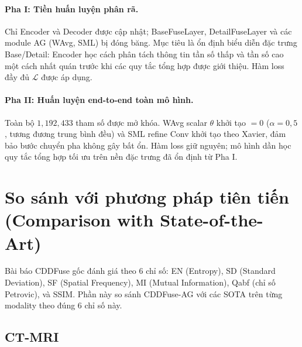 \paragraph{Pha I: Tiền huấn luyện phân rã.}
Chỉ Encoder và Decoder được cập nhật; BaseFuseLayer, DetailFuseLayer và các module AG (WAvg, SML) bị đóng băng. Mục tiêu là ổn định biểu diễn đặc trưng Base/Detail: Encoder học cách phân tách thông tin tần số thấp và tần số cao một cách nhất quán trước khi các quy tắc tổng hợp được giới thiệu. Hàm loss đầy đủ $\mathcal{L}$ được áp dụng.

\paragraph{Pha II: Huấn luyện end-to-end toàn mô hình.}
Toàn bộ $1{,}192{,}433$ tham số được mở khóa. WAvg scalar $\theta$ khởi tạo $= 0$ ($\alpha = 0{,}5$, tương đương trung bình đều) và SML refine Conv khởi tạo theo Xavier, đảm bảo bước chuyển pha không gây bất ổn. Hàm loss giữ nguyên; mô hình dần học quy tắc tổng hợp tối ưu trên nền đặc trưng đã ổn định từ Pha I.

\section{So sánh với phương pháp tiên tiến (Comparison with State-of-the-Art)}
\label{sec:paper-6metrics}

Bài báo CDDFuse gốc \cite{zhao2023cddfuse} đánh giá theo 6 chỉ số: EN (Entropy), SD (Standard Deviation), SF (Spatial Frequency), MI (Mutual Information), Qabf (chỉ số Petrovic), và SSIM. Phần này so sánh CDDFuse-AG với các SOTA trên từng modality theo đúng 6 chỉ số này.

\subsection{CT-MRI}

